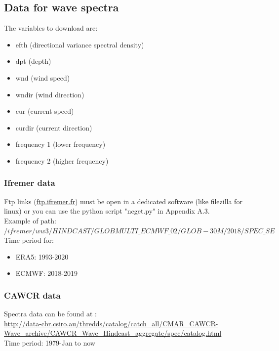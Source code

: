 \documentclass[preprints,briefreport,accept,oneauthor,pdftex]{Definitions/mdpi}
\begin{document}
\subsection{Data for wave spectra}
The variables to download are:
\begin{itemize}
    \item efth (directional variance spectral density) 
    \item dpt (depth)
    \item wnd (wind speed)
     \item wndir (wind direction)
     \item cur (current speed)
     \item curdir (current direction)
     \item frequency 1 (lower frequency)
     \item frequency 2 (higher frequency)
\end{itemize}
\subsubsection{Ifremer data}
\noindent Ftp links (\url{ftp.ifremer.fr}) must be open in a dedicated software (like filezilla for linux) or you can use the python script "ncget.py" in Appendix A.3.\\
Example of path: \\
$/ifremer/ww3/HINDCAST/GLOBMULTI\_ECMWF\_02/GLOB-30M/2018/SPEC\_SE$\\
Time period for:
\begin{itemize}
      \item ERA5: 1993-2020
    \item ECMWF: 2018-2019
\end{itemize}

\subsubsection{CAWCR data}
\noindent Spectra data can be found at :\\ \url{http://data-cbr.csiro.au/thredds/catalog/catch_all/CMAR_CAWCR-Wave_archive/CAWCR_Wave_Hindcast_aggregate/spec/catalog.html}\\
Time period: 1979-Jan to now

\end{document}
